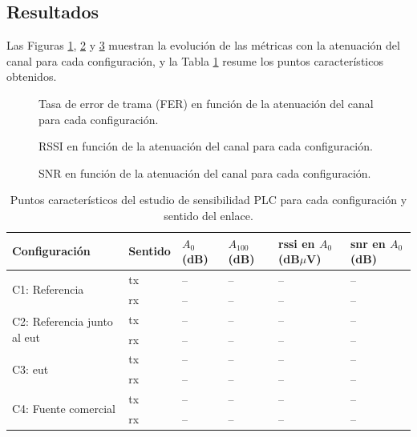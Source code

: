 \subsection{Resultados}
\label{subsec:resultados_sensibilidad}

Las Figuras \ref{fig:fer_vs_atenuacion}, \ref{fig:rssi_vs_atenuacion} y \ref{fig:snr_vs_atenuacion} muestran la evolución de las métricas con la atenuación del canal para cada configuración, y la Tabla \ref{tab:resultados_sensibilidad} resume los puntos característicos obtenidos.

\begin{figure}[htbp]
    \centering
    \caption{Tasa de error de trama (FER) en función de la atenuación del canal para cada configuración.}
    \label{fig:fer_vs_atenuacion}
\end{figure}

\begin{figure}[htbp]
    \centering
    \caption{RSSI en función de la atenuación del canal para cada configuración.}
    \label{fig:rssi_vs_atenuacion}
\end{figure}

\begin{figure}[htbp]
    \centering
    \caption{SNR en función de la atenuación del canal para cada configuración.}
    \label{fig:snr_vs_atenuacion}
\end{figure}

\begin{table}[!h]
\centering
\small
\begin{tabular}{|p{3.4cm}|p{1.9cm}|p{1.6cm}|p{1.6cm}|p{2.2cm}|p{2.0cm}|}
\hline
\textbf{Configuración} & \textbf{Sentido} & \textbf{$A_{0}$ (dB)} & \textbf{$A_{100}$ (dB)} & \textbf{\gls{rssi} en $A_{0}$ (dB$\mu$V)} & \textbf{\gls{snr} en $A_{0}$ (dB)} \\ \hline
\multirow{2}{3.4cm}{C1: Referencia} & \gls{tx} & -- & -- & -- & -- \\ \cline{2-6}
 & \gls{rx} & -- & -- & -- & -- \\ \hline
\multirow{2}{3.4cm}{C2: Referencia junto al \gls{eut}} & \gls{tx} & -- & -- & -- & -- \\ \cline{2-6}
 & \gls{rx} & -- & -- & -- & -- \\ \hline
\multirow{2}{3.4cm}{C3: \gls{eut}} & \gls{tx} & -- & -- & -- & -- \\ \cline{2-6}
 & \gls{rx} & -- & -- & -- & -- \\ \hline
\multirow{2}{3.4cm}{C4: Fuente comercial} & \gls{tx} & -- & -- & -- & -- \\ \cline{2-6}
 & \gls{rx} & -- & -- & -- & -- \\ \hline
\end{tabular}
\caption{Puntos característicos del estudio de sensibilidad PLC para cada configuración y sentido del enlace.}
\label{tab:resultados_sensibilidad}
\end{table}


